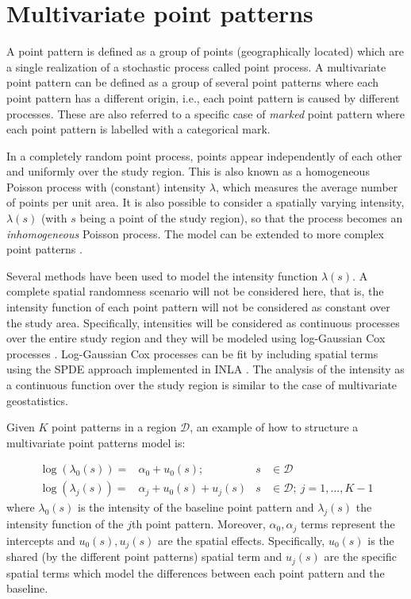 \section{Multivariate point patterns}
\label{sec:mpp}

\medskip
A point pattern is defined as a group of points (geographically located) which are a single realization of a stochastic process called point process. A multivariate point pattern can be defined as a group of several point patterns where each point pattern has a different origin, i.e., each point pattern is caused by different processes. These are also referred to a specific case of \textit{marked} point pattern \citep{spatstat:2015} where each point pattern is labelled with a categorical mark.

In a completely random point process, points appear independently of each other and uniformly over the study region. This is also known as a homogeneous Poisson process with (constant) intensity $\lambda$, which measures the average number of points per unit area. It is also possible to consider a spatially varying intensity, $\lambda(s)$ (with $s$ being a point of the study region), so that the process becomes an \textit{inhomogeneous} Poisson process. The model can be extended to more complex point patterns \citep[see, for example,][]{spatstat:2015}.

Several methods have been used to model the intensity function $\lambda(s)$. A complete spatial randomness scenario will not be considered here, that is, the intensity function of each point pattern will not be considered as constant over the study area. Specifically, intensities will be considered as continuous processes over the entire study region and they will be modeled using log-Gaussian Cox processes \citep{Moller,DiggleMoraga}. Log-Gaussian Cox processes can be fit by including spatial terms using the SPDE approach implemented in INLA \citep{Simpsonetal:2016}. The analysis of the intensity as a continuous function over the study region is similar to the case of multivariate geostatistics.

\medskip
Given $K$ point patterns in a region $\mathcal{D}$, an example of how to structure a multivariate point patterns model is: 


\begin{align*}
\log(\lambda_{0}(s)) =& \alpha_0 + u_{0}(s);  &s&\in \mathcal{D}\\
\log(\lambda_{j}(s)) =& \alpha_j + u_{0}(s) + u_{j}(s)  &s&\in \mathcal{D};\ j=1,\ldots,K-1\nonumber
\end{align*}
\noindent
where $\lambda_{0}(s)$ is the intensity of the baseline point pattern and $\lambda_{j}(s)$ the intensity function of the $j$th point pattern. Moreover, $\alpha_0,\alpha_j$ terms represent the intercepts and $u_0(s), u_j(s)$ are the spatial effects. Specifically, $u_0(s)$ is the shared (by the different point patterns) spatial term and $u_j(s)$ are the specific spatial terms which model the differences between each point pattern and the baseline. 

